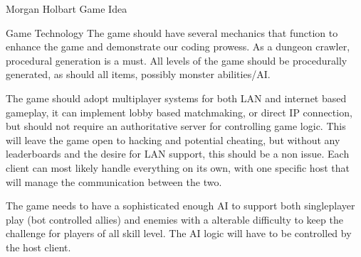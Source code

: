 \documentclass[12pt]{report}
\begin{document}
\begin{section}{Morgan Holbart Game Idea}
\begin{subsection}{Game Technology}
The game should have several mechanics that function to enhance the game and
demonstrate our coding prowess. As a dungeon crawler, procedural generation
is a must. All levels of the game should be procedurally generated, as
should all items, possibly monster abilities/AI.

The game should adopt multiplayer systems for both LAN and internet based
gameplay, it can implement lobby based matchmaking, or direct IP connection,
but should not require an authoritative server for controlling game logic. 
This will leave the game open to hacking and potential cheating, but without
any leaderboards and the desire for LAN support, this should be a non issue.
Each client can most likely handle everything on its own, with one specific
host that will manage the communication between the two.

The game needs to have a sophisticated enough AI to support both
singleplayer play (bot controlled allies) and enemies with a alterable
difficulty to keep the challenge for players of all skill level. The AI
logic will have to be controlled by the host client.
\end{subsection}
\end{section}
\end{document}

